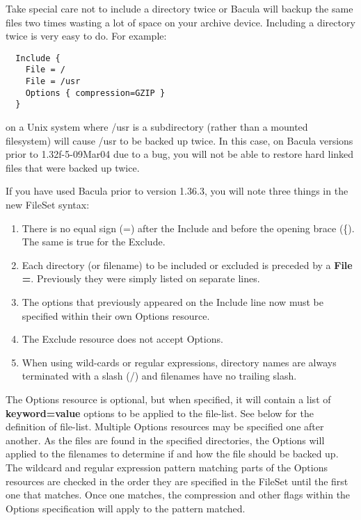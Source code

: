 Take special care not to include a directory twice or Bacula will backup
the same files two times wasting a lot of space on your archive device.
Including a directory twice is very easy to do.  For example:

\footnotesize
\begin{verbatim}
  Include {
    File = /
    File = /usr
    Options { compression=GZIP }
  }
\end{verbatim}
\normalsize

on a Unix system where /usr is a subdirectory (rather than a mounted
filesystem) will cause /usr to be backed up twice. In this case, on Bacula
versions prior to 1.32f-5-09Mar04 due to a bug, you will not be able to
restore hard linked files that were backed up twice. 

If you have used Bacula prior to version 1.36.3, you will note three things in
the new FileSet syntax: 

\begin{enumerate}
\item There is no equal sign (=) after the Include and before the opening
   brace (\{). The same is true for the Exclude. 
\item Each directory (or filename) to be included or excluded is preceded by a {\bf File
   =}.  Previously they were simply listed on separate lines. 
\item The options that previously appeared on the Include line now must be
   specified within their own Options resource.
\item The Exclude resource does not accept Options. 
\item When using wild-cards or regular expressions, directory names are
   always terminated with a slash (/) and filenames have no trailing slash.
\end{enumerate}

The Options resource is optional, but when specified, it will contain a
list of {\bf keyword=value} options to be applied to the file-list.
See below for the definition of file-list.    
Multiple Options resources may be specified one after another.  As the
files are found in the specified directories, the Options will applied to
the filenames to determine if and how the file should be backed up.  The
wildcard and regular expression pattern matching parts of the
Options resources are checked in the order they are specified in the
FileSet until the first one that matches. Once one matches, the
compression and other flags within the Options specification will
apply to the pattern matched.


